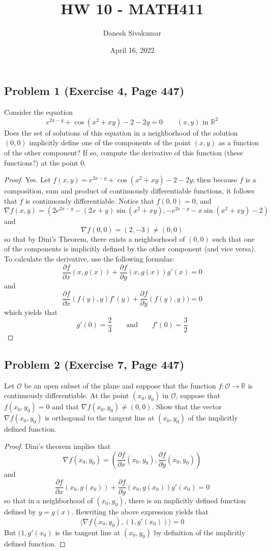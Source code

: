 \documentclass{article}
\title{HW 10 - MATH411}
\author{Danesh Sivakumar}
\date{April 16, 2022}
\begin{document}
\maketitle 


\subsection*{Problem 1 (Exercise 4, Page 447)}
Consider the equation 
\[ e^{2x-y} + \cos{(x^2 + xy)} - 2 - 2y = 0 \qquad \text{$(x, y)$ in $\mathbb{R}^2$}\]
Does the set of solutions of this equation in a neighborhood of the solution $(0, 0)$ implicitly define one of the components of the point $(x, y)$ as a function of the other component? If so, compute the derivative of this function (these functions?) at the point 0.
\begin{proof}
Yes. Let $f(x, y) = e^{2x-y} + \cos{(x^2 + xy)} - 2 - 2y$; then because $f$ is a composition, sum and product of continuously differentiable functions, it follows that $f$ is continuously differentiable. Notice that $f(0, 0) = 0$, and
\[  \nabla f(x, y) = (2e^{2x-y}-(2x + y) \sin(x^2 + xy), -e^{2x-y}-x \sin(x^2 + xy)-2)\]
and 
\[ \nabla f(0, 0) = (2, -3) \neq (0, 0)\]
so that by Dini's Theorem, there exists a neighborhood of $(0, 0)$ such that one of the components is implicitly defined by the other component (and vice versa). To calculate the derivative, use the following formulas:
\[ \frac{\partial f}{\partial x}(x, g(x)) + \frac{\partial f}{\partial y}(x, g(x))g'(x) = 0\]
and 
\[ \frac{\partial f}{\partial x}(f(y), y)f'(y) + \frac{\partial f}{\partial y}(f(y), y)) = 0\]
which yields that
\[ g'(0) = \frac{2}{3} \qquad \text{and} \qquad f'(0) = \frac{3}{2}\]
\end{proof}


\subsection*{Problem 2 (Exercise 7, Page 447)}
Let $\mathcal{O}$ be an open subset of the plane and suppose that the function $f \colon \mathcal{O} \to \mathbb{R}$ is continuously differentiable. At the point $(x_0, y_0)$ in $\mathcal{O}$, suppose that $f(x_0, y_0) = 0$ and that $\nabla f(x_0, y_0) \neq (0, 0)$. Show that the vector $\nabla f(x_0, y_0)$ is orthogonal to the tangent line at $(x_0, y_0)$ of the implicitly defined function.
\begin{proof} 
Dini's theorem implies that
\[ \nabla f(x_0, y_0) = \left( \frac{\partial f}{\partial x}(x_0, y_0), \frac{\partial f}{\partial y}(x_0, y_0)\right)\]
and
\[ \frac{\partial f}{\partial x}(x_0, g(x_0)) + \frac{\partial f}{\partial y}(x_0, g(x_0))g'(x_0) = 0\]
so that in a neighborhood of $(x_0, y_0)$, there is an implicitly defined function defined by $y = g(x)$. Rewriting the above expression yields that
\[ \langle \nabla f(x_0, y_0), (1, g'(x_0))\rangle = 0 \]
But $(1, g'(x_0)$ is the tangent line at $(x_0, y_0)$ by definition of the implicitly defined function.
\end{proof}
\end{document}
